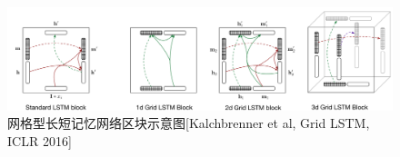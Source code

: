\begin{figure}[h]
	\centering
	\includegraphics[width=\textwidth]{demo_images/gridlstm}
	\caption{网格型长短记忆网络区块示意图[Kalchbrenner et al, Grid LSTM, ICLR 2016]}
\end{figure}